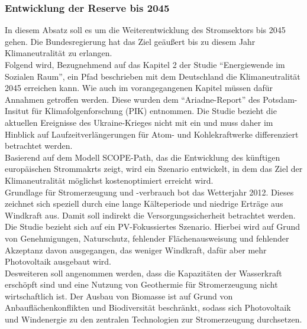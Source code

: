 		\subsubsection{Entwicklung der Reserve bis 2045}
		In diesem Absatz soll es um die Weiterentwicklung des Stromsektors bis 2045 gehen. Die Bundesregierung hat das Ziel geäußert bis zu diesem Jahr Klimaneutralität zu erlangen.\\
		Folgend wird, Bezugnehmend auf das Kapitel 2 der Studie "`Energiewende im Sozialen Raum"', ein Pfad beschrieben mit dem Deutschland die Klimaneutralität 2045 erreichen kann. Wie auch im vorangegangenen Kapitel müssen dafür Annahmen getroffen werden. Diese wurden dem "`Ariadne-Report"' des Potsdam-Insitut für Klimafolgenforschung (PIK) entnommen. Die Studie bezieht die aktuellen Ereignisse des Ukraine-Krieges nicht mit ein und muss daher im Hinblick auf Laufzeitverlängerungen für Atom- und Kohlekraftwerke differenziert betrachtet werden.\\
		
		Basierend auf dem Modell SCOPE-Path, das die Entwicklung des künftigen europäischen Strommakrts zeigt, wird ein Szenario entwickelt, in dem das Ziel der Klimaneutralität möglichst kostenoptimiert erreicht wird.\\
		Grundlage für Stromerzeugung und -verbrauch bot das Wetterjahr 2012. Dieses zeichnet sich speziell durch eine lange Kälteperiode und niedrige Erträge aus Windkraft aus. Damit soll indirekt die Versorgungssicherheit betrachtet werden.\\
		
		Die Studie bezieht sich auf ein PV-Fokussiertes Szenario. Hierbei wird auf Grund von Genehmigungen, Naturschutz, fehlender Flächenausweisung und fehlender Akzeptanz davon ausgegangen, das weniger Windkraft, dafür aber mehr Photovoltaik ausgebaut wird.\\
		Desweiteren soll angenommen werden, dass die Kapazitäten der Wasserkraft erschöpft sind und eine Nutzung von Geothermie für Stromerzeugung nicht wirtschaftlich ist. Der Ausbau von Biomasse ist auf Grund von Anbauflächenkonflikten und Biodiversität beschränkt, sodass sich Photovoltaik und Windenergie zu den zentralen Technologien zur Stromerzeugung durchsetzen.\\
		

